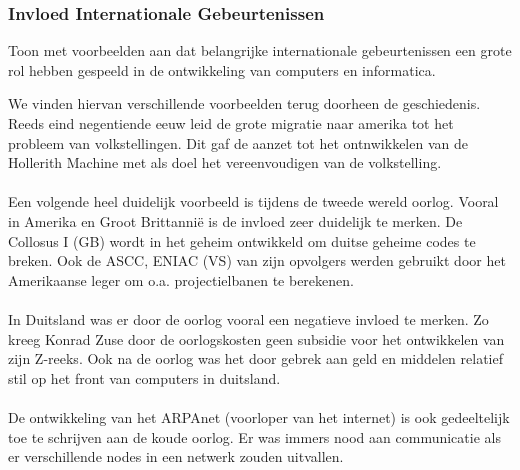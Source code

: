 \documentclass[../main.tex]{subfiles}
\begin{document}
\subsubsection{Invloed Internationale Gebeurtenissen}
\begin{question}
Toon met voorbeelden aan dat belangrijke internationale gebeurtenissen een grote rol hebben gespeeld in de ontwikkeling van computers en informatica.
\end{question}
\begin{solution}
We vinden hiervan verschillende voorbeelden terug doorheen de geschiedenis.
Reeds eind negentiende eeuw leid de grote migratie naar amerika tot het probleem van volkstellingen.
Dit gaf de aanzet tot het ontnwikkelen van de Hollerith Machine met als doel het vereenvoudigen van de volkstelling.
\\\\
Een volgende heel duidelijk voorbeeld is tijdens de tweede wereld oorlog.
Vooral in Amerika en Groot Brittanni\"e is de invloed zeer duidelijk te merken.
De Collosus I (GB) wordt in het geheim ontwikkeld om duitse geheime codes te breken.
Ook de ASCC, ENIAC (VS) van zijn opvolgers werden gebruikt door het Amerikaanse leger om o.a. projectielbanen te berekenen.
\\\\
In Duitsland was er door de oorlog vooral een negatieve invloed te merken.
Zo kreeg Konrad Zuse door de oorlogskosten geen subsidie voor het ontwikkelen van zijn Z-reeks.
Ook na de oorlog was het door gebrek aan geld en middelen relatief stil op het front van computers in duitsland.
\\\\
De ontwikkeling van het ARPAnet (voorloper van het internet) is ook gedeeltelijk toe te schrijven aan de koude oorlog.
Er was immers nood aan communicatie als er verschillende nodes in een netwerk zouden uitvallen.
\end{solution}
\end{document}
